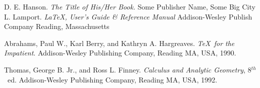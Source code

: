 \begin{thebibliography}{XxxxNN}                 %
   D. E. Hanson.      %
      {\em The Title of His/Her Book.}          %
      Some Publisher Name,                      %
      Some Big City                             %
   L. Lamport.      %
      {\em LaTeX, User's Guide \& Reference     %
      Manual}                                   %
      Addison-Wesley Publish Company            %
      Reading, Massachusetts                    %

   Abrahams, Paul W.,
    Karl Berry, and Kathryn A. Hargreaves.
    {\em \TeX\ for the Impatient}.
    Addison-Wesley Publishing Company,
    Reading MA, USA, 1990.


   Thomas, George B. Jr.,
    and Ross L. Finney.
    {\em Calculus and Analytic Geometry},
    8$^{th}$\ ed.
    Addison-Wesley Publishing Company,
    Reading MA, USA, 1992.

\end{thebibliography}